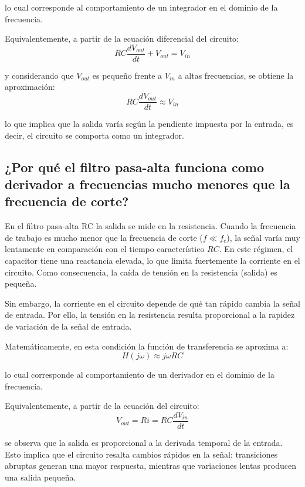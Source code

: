 \documentclass[12pt,a4paper]{article}
\begin{document}
lo cual corresponde al comportamiento de un integrador en el dominio de la frecuencia.

Equivalentemente, a partir de la ecuación diferencial del circuito:
\begin{equation}
RC \frac{dV_{out}}{dt} + V_{out} = V_{in}
\end{equation}

y considerando que $V_{out}$ es pequeño frente a $V_{in}$ a altas frecuencias, se obtiene la aproximación:
\begin{equation}
RC \frac{dV_{out}}{dt} \approx V_{in}
\end{equation}

lo que implica que la salida varía según la pendiente impuesta por la entrada, es decir, el circuito se comporta como un integrador.
\subsection{¿Por qué el filtro pasa-alta funciona como derivador a frecuencias mucho menores que la frecuencia de corte?}

En el filtro pasa-alta RC la salida se mide en la resistencia. Cuando la frecuencia de trabajo es mucho menor que la frecuencia de corte ($f \ll f_c$), la señal varía muy lentamente en comparación con el tiempo característico $RC$. En este régimen, el capacitor tiene una reactancia elevada, lo que limita fuertemente la corriente en el circuito. Como consecuencia, la caída de tensión en la resistencia (salida) es pequeña.

Sin embargo, la corriente en el circuito depende de qué tan rápido cambia la señal de entrada. Por ello, la tensión en la resistencia resulta proporcional a la rapidez de variación de la señal de entrada.

Matemáticamente, en esta condición la función de transferencia se aproxima a:
\begin{equation}
H(j\omega) \approx j\omega RC
\end{equation}

lo cual corresponde al comportamiento de un derivador en el dominio de la frecuencia.

Equivalentemente, a partir de la ecuación del circuito:
\begin{equation}
V_{out} = R i = RC \frac{dV_{in}}{dt}
\end{equation}

se observa que la salida es proporcional a la derivada temporal de la entrada. Esto implica que el circuito resalta cambios rápidos en la señal: transiciones abruptas generan una mayor respuesta, mientras que variaciones lentas producen una salida pequeña.
\end{document}
